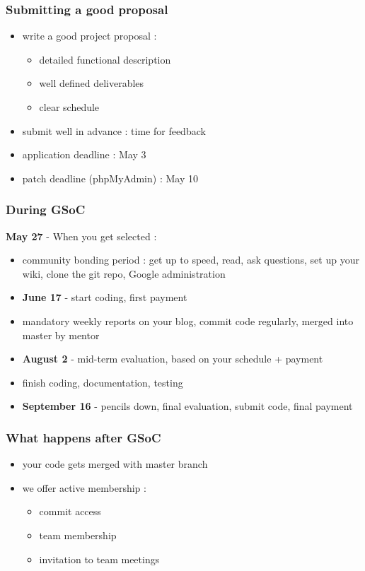 \documentclass[14pt]{beamer}
\begin{document}
  \begin{frame}
    \frametitle{Submitting a good proposal}
    \begin{itemize}
      \item write a good project proposal :
      \begin{itemize}
        \item detailed functional description
        \item well defined deliverables
        \item clear schedule
      \end{itemize}
      \item submit well in advance : time for feedback
      \item application deadline : May 3
      \item patch deadline (phpMyAdmin) : May 10
    \end{itemize}
  \end{frame}
  \begin{frame}
    \frametitle{During GSoC}
    \textbf{May 27} - When you get selected :
    \begin{itemize}
      \item community bonding period : get up to speed, read, ask questions, set up your wiki, clone the git repo, Google administration
      \pause
      \item \textbf{June 17} - start coding, first payment
      \item mandatory weekly reports on your blog, commit code regularly, merged into master by mentor
      \pause
      \item \textbf{August 2} - mid-term evaluation, based on your schedule + payment
      \pause
      \item finish coding, documentation, testing
      \pause
      \item \textbf{September 16} - pencils down, final evaluation, submit code, final payment
    \end{itemize}
  \end{frame}
  \begin{frame}
    \frametitle{What happens after GSoC}
    \begin{itemize}
      \item your code gets merged with master branch
      \item we offer active membership :
      \begin{itemize}
        \item commit access
        \item team membership
        \item invitation to team meetings
      \end{itemize}
    \end{itemize}
  \end{frame}
\end{document}
